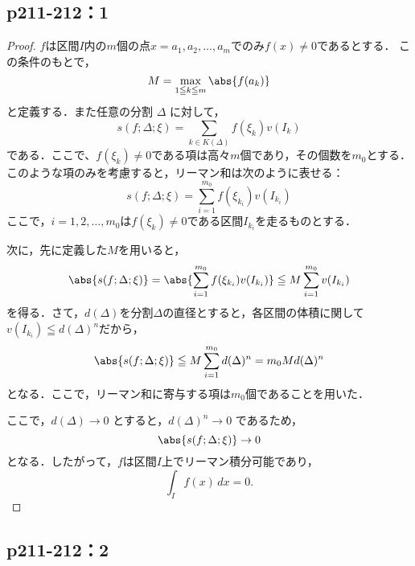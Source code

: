 \documentclass[uplatex,dvipdfmx,a4paper,10pt,fleqn]{jsarticle}
\begin{document}
\subsection*{p211-212：1}


\begin{tleftbar}
    \begin{proof}
    $f$は区間$I$内の$m$個の点$x = a_1, a_2, \ldots, a_m$でのみ$f(x) \ne 0$であるとする．
    この条件のもとで，
    \[
    M = \max_{1 \leqq k \leqq m} \abs{f(a_k)}
    \]
    と定義する．また任意の分割 $\Delta$ に対して，
    \[
    s(f; \Delta; \xi) = \sum_{k \in K(\Delta)} f(\xi_k) v(I_k)
    \]
    である．ここで、$f(\xi_k) \ne 0$である項は高々$m$個であり，その個数を$m_0$とする．
    このような項のみを考慮すると，リーマン和は次のように表せる：
    \[
    s(f; \Delta; \xi) = \sum_{i=1}^{m_0} f(\xi_{k_i}) v(I_{k_i})
    \]
    ここで，$i = 1, 2, \ldots, m_0$は$f(\xi_k) \ne 0$である区間$ I_{k_i} $を走るものとする．
    
    次に，先に定義した$M$を用いると，
    \[
    \abs{s(f; \Delta; \xi)} = \abs{\sum_{i=1}^{m_0} f(\xi_{k_i}) v(I_{k_i})} \leqq M \sum_{i=1}^{m_0} v(I_{k_i})
    \]
    を得る．さて，$d(\Delta)$を分割$\Delta$の直径とすると，各区間の体積に関して$ v(I_{k_i}) \leqq d(\Delta)^n $だから，
    \[
    \abs{s(f; \Delta; \xi)} \leqq M \sum_{i=1}^{m_0} d(\Delta)^n = m_0 M d(\Delta)^n
    \]
    となる．ここで，リーマン和に寄与する項は$m_0$個であることを用いた．
    
    ここで，$d(\Delta) \to 0$ とすると，$d(\Delta)^n \to 0$ であるため，
    \[
    \abs{s(f; \Delta; \xi)} \to 0
    \]
    となる．したがって，$f$は区間$I$上でリーマン積分可能であり，
    \[
    \int_{I} f(x)\, dx = 0.
    \]
    \end{proof}
    \end{tleftbar}

    \subsection*{p211-212：2}
    
\end{document}
